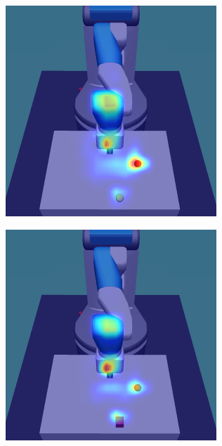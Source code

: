 \begin{figure}[h!]
\begin{subfigure}{0.24\columnwidth}
    \includegraphics[width=\linewidth]{figures/chapter6/distractor_saliency_fetch_pro_off/color_visual_std}
  \end{subfigure}
  \begin{subfigure}{0.24\columnwidth}
    \includegraphics[width=\linewidth]{figures/chapter6/distractor_saliency_fetch_pro_off/shape_visual_std}

\end{subfigure}
\end{figure}
